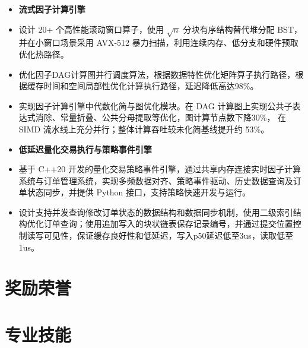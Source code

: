 \documentclass{resume}
\begin{document}
\begin{itemize}[parsep=0.3ex]
\item[] \textbf{流式因子计算引擎}
\item \large 设计 20+ 个高性能滚动窗口算子，使用 $\sqrt{n}$ 分块有序结构替代堆分配 BST，并在小窗口场景采用 AVX-512 暴力扫描，利用连续内存、低分支和硬件预取优化热路径。
\item \large 优化因子DAG计算图并行调度算法，根据数据特性优化矩阵算子执行路径，根据缓存时间和空间局部性优化计算执行路径，延迟降低高达98\%。
\item \large 实现因子计算引擎中代数化简与图优化模块。在 DAG 计算图上实现公共子表达式消除、常量折叠、公共分母提取等优化，图计算节点数下降30\%，
在 SIMD 流水线上充分并行；整体计算吞吐较未化简基线提升约 53\%。
\item[] \textbf{低延迟量化交易执行与策略事件引擎}
\item \large 基于 C++20 开发的量化交易策略事件引擎，通过共享内存连接实时因子计算系统与订单管理系统，实现多频数据对齐、策略事件驱动、历史数据查询及订单状态同步，并提供 Python 接口，支持策略快速开发与运行。
\item \large 设计支持并发查询修改订单状态的数据结构和数据同步机制，使用二级索引结构优化订单查询；使用追加写入的块状链表保存记录编号，并通过提交位置控制读写可见性，保证缓存良好性和低延迟，写入p50延迟低至3us，读取低至1us。

\end{itemize}


\section{奖励荣誉}

{\footnotesize
{}


}

\section{专业技能}

{\footnotesize
{}




}
\end{document}

